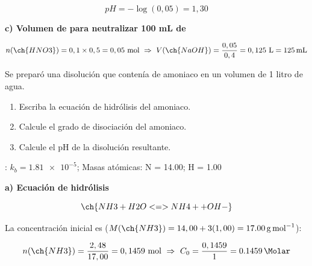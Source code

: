 \begin{exerciseEVAU}
\begin{solu}
        \begin{equation*}
            pH = -\log(0,05) = 1,30
        \end{equation*}

        \textbf{c) Volumen de  para neutralizar 100 mL de }

        \begin{equation*}
            n(\ch{HNO3}) = 0,1\times0,5 = 0,05 \ \text{mol} \ \Rightarrow \ V(\ch{NaOH}) = \dfrac{0,05}{0,4} = 0,125 \ \si{\litre} = \SI{125}{\milli\litre}
        \end{equation*}

    \end{solu}
\end{exerciseEVAU}


\begin{exerciseEVAU}
    Se preparó una disolución que contenía  de amoniaco en un volumen de 1 litro de agua.
    \begin{enumerate}[label=\letraminuscula]
        \item Escriba la ecuación de hidrólisis del amoniaco.
        \item Calcule el grado de disociación del amoniaco.
        \item Calcule el pH de la disolución resultante.
    \end{enumerate}
    \datos{}: \(k_b = \num{1.81e-5}\); Masas atómicas: N = \num{14.00}; H = \num{1.00}


    \begin{solu}


        \textbf{a) Ecuación de hidrólisis}

        \begin{equation*}
            \ch{NH3 + H2O <=> NH4+ + OH-}
        \end{equation*}

        La concentración inicial es (\(M(\ch{NH3}) = 14,00+3(1,00) = \SI{17.00}{\gram\per\mole}\)):

        \begin{equation*}
            n(\ch{NH3}) = \dfrac{2,48}{17,00} = 0,1459 \ \text{mol} \ \Rightarrow \ C_0 = \dfrac{0,1459}{1} = \SI{0.1459}{\Molar}
        \end{equation*}


\end{solu}
\end{exerciseEVAU}
